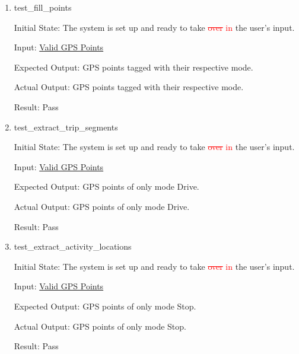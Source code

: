 \documentclass[12pt, titlepage]{article}
\begin{document}
\begin{enumerate}
    \item{test\_fill\_points} \label{test_fill_points}

    Initial State: The system is set up and ready to take \textcolor{red}{\sout{over} in} the user’s input.
    
    Input: \href{https://github.com/paezha/PyERT-BLACK/blob/rev0-test/quarto-example/data/sample-gps/sample-gps-1.csv}{Valid GPS Points}

    Expected Output: GPS points tagged with their respective mode.
    
    Actual Output: GPS points tagged with their respective mode.

    Result: Pass

    \item{test\_extract\_trip\_segments} \label{test_extract_trip_segments}

    Initial State: The system is set up and ready to take \textcolor{red}{\sout{over} in} the user’s input.
    
    Input: \href{https://github.com/paezha/PyERT-BLACK/blob/rev0-test/quarto-example/data/sample-gps/sample-gps-1.csv}{Valid GPS Points}
    
    Expected Output: GPS points of only mode Drive.
    
    Actual Output: GPS points of only mode Drive.

    Result: Pass

    \item{test\_extract\_activity\_locations} \label{test_extract_activity_locations}

    Initial State: The system is set up and ready to take \textcolor{red}{\sout{over} in} the user’s input.
    
    Input: \href{https://github.com/paezha/PyERT-BLACK/blob/rev0-test/quarto-example/data/sample-gps/sample-gps-1.csv}{Valid GPS Points}
    
    Expected Output: GPS points of only mode Stop.
    
    Actual Output: GPS points of only mode Stop.

    Result: Pass

\end{enumerate}
\end{document}

